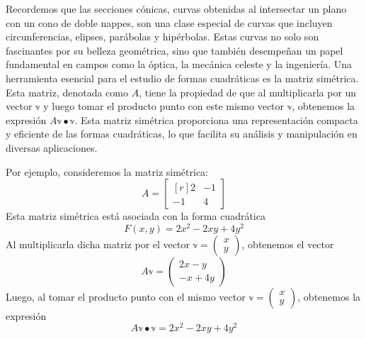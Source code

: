 Recordemos que las secciones cónicas, curvas obtenidas al intersectar un plano con un cono de doble nappes, son una clase especial de curvas que incluyen circunferencias, elipses, parábolas y hipérbolas. Estas curvas no solo son fascinantes por su belleza geométrica, sino que también desempeñan un papel fundamental en campos como la óptica, la mecánica celeste y la ingeniería. Una herramienta esencial para el estudio de formas cuadráticas es la matriz simétrica. Esta matriz, denotada como $A$, tiene la propiedad de que al multiplicarla por un vector $\mathbb{v}$ y luego tomar el producto punto con este mismo vector $\mathbb{v}$, obtenemos la expresión $A\mathbb{v} \bullet \mathbb{v}$. Esta matriz simétrica proporciona una representación compacta y eficiente de las formas cuadráticas, lo que facilita su análisis y manipulación en diversas aplicaciones.

Por ejemplo, consideremos la matriz simétrica:
$$A = \begin{bmatrix*}[r] 2 & -1 \\ -1 & 4 \end{bmatrix*}$$
Esta matriz simétrica está asociada con la forma cuadrática
$$F(x, y) = 2x^2 - 2xy + 4y^2$$
Al multiplicarla dicha matriz por el vector $\mathbb{v} = \begin{pmatrix} x \\ y \end{pmatrix}$, obtenemos el vector
$$A\mathbb{v} = \begin{pmatrix} 2x - y \\ -x + 4y \end{pmatrix}$$
Luego, al tomar el producto punto con el mismo vector $\mathbb{v} = \begin{pmatrix} x \\ y \end{pmatrix}$, obtenemos la expresión
$$A\mathbb{v} \bullet \mathbb{v} = 2x^2 - 2xy + 4y^2$$

